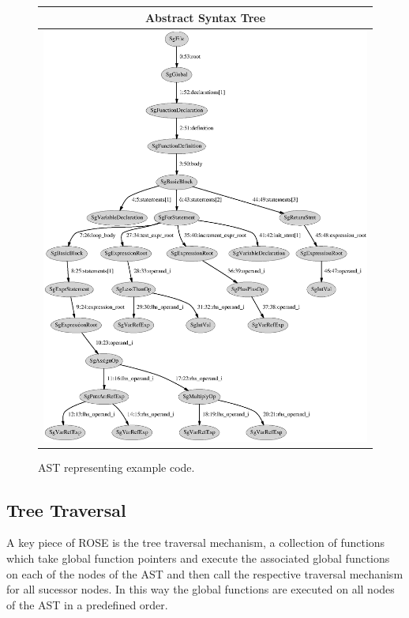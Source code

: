 \documentclass[10pt]{article}
\begin{document}
\begin{figure}[h]
\begin{center}
\begin{tabular}{|c|} \hline
 Abstract Syntax Tree \\\hline\hline
\includegraphics[scale=0.9]{AST.ps}
\\\hline
\end{tabular}
\end{center}
\caption{AST representing example code. }
\label{AST_Graph}
\end{figure}



\subsection{Tree Traversal}

    A key piece of ROSE is the tree traversal mechanism, a collection of functions which take global
function pointers and execute the associated global functions on each of the nodes of the AST and
then call the respective traversal mechanism for all sucessor nodes.  In this way the global
functions are executed on all nodes of the AST in a predefined order.
\end{document}
